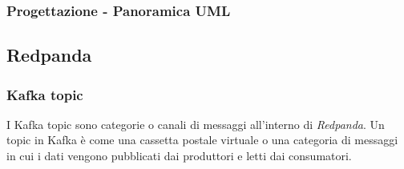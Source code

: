 \subsubsection{Progettazione - Panoramica UML}

\subsection{Redpanda}
\subsubsection{Kafka topic}
I Kafka topic sono categorie o canali di messaggi all'interno di \textit{Redpanda}. Un topic in Kafka è come una cassetta postale virtuale o una categoria di messaggi in cui i dati vengono pubblicati dai produttori e letti dai consumatori.


